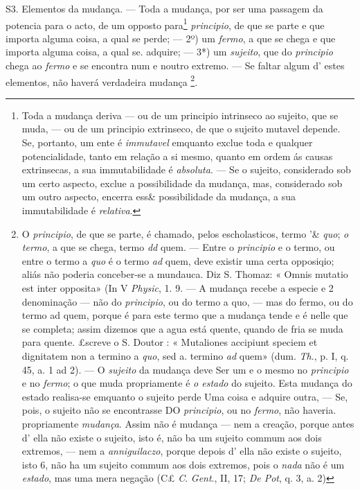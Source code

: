 S3. Elementos da mudança. --- Toda a mudança, por ser uma passagem da potencia para o acto, de um opposto para\footnote{Toda a mudança deriva --- ou de um principio intrinseco ao sujeito, que se muda, --- ou de um principio extrinseco, de que o sujeito mutavel depende. Se, portanto, um ente é \emph{immutavel} emquanto exclue toda e qualquer potencialidade, tanto em relação a si mesmo, quanto em ordem ás causas extrinsecas, a sua immutabilidade é \emph{absoluta}. --- Se o sujeito, considerado sob um certo aspecto, exclue a possibilidade da mudança, mas, considerado sob um outro aspecto, encerra ess\& possibilidade da mudança, a sua immutabilidade é \emph{relativa}.}  \emph{principio}, de que se parte e que importa alguma coisa, a qual se perde; --- 2º) um \emph{fermo}, a que se chega e que importa alguma coisa, a qual se. adquire; --- 3*) um \emph{sujeito}, que do \emph{principio} chega ao \emph{fermo} e se encontra num e noutro extremo. --- Se faltar algum d' estes elementos, não haverá verdadeira mudança \footnote{O \emph{principio}, de que se parte, é chamado, pelos escholasticos, termo '\& \emph{quo}; \emph{o termo}, a que se chega, termo \emph{dd} quem. --- Entre o \emph{principio} e o termo, ou entre o termo a \emph{quo} é o termo \emph{ad} quem, deve existir uma certa opposiqio; aliás não poderia conceber-se a mundauca. Diz S. Thomaz: « Omnis mutatio est inter opposita» (In V \emph{Physic}, 1. 9. --- A mudança recebe a especie e 2 denominação --- não do \emph{principio}, ou do termo a quo, --- mas do fermo, ou do termo ad quem, porque é para este termo que a mudança tende e é nelle que se completa; assim dizemos que a agua está quente, quando de fria se muda para quente. £screve o S. Doutor : « Mutaliones accipiunt speciem et dignitatem non a termino a \emph{quo}, sed a. termino \emph{ad} quem» (dum. \emph{Th}., p. I, q. 45, a. 1 ad 2). --- O \emph{sujeito} da mudança deve Ser um e o mesmo no \emph{principio} e no \emph{fermo}; o que muda propriamente é \emph{o estado} do sujeito. Esta mudança do estado realisa-se emquanto o sujeito perde Uma coisa e adquire outra, --- Se, pois, o sujeito não se encontrasse DO \emph{principio}, ou no \emph{fermo}, não haveria. propriamente \emph{mudança}. Assim não é mudança --- nem a creação, porque antes d' ella não existe o sujeito, isto é, não ba um sujeito commum aos dois extremos, --- nem a \emph{anniguilaczo}, porque depois d' ella não existe o sujeito, isto 6, não ha um sujeito commum aos dois extremos, pois o \emph{nada} não é um \emph{estado}, mas uma mera negação (C£ \emph{C}. \emph{Gent}., II, 17; \emph{De Pot}, q. 3, a. 2)}.

